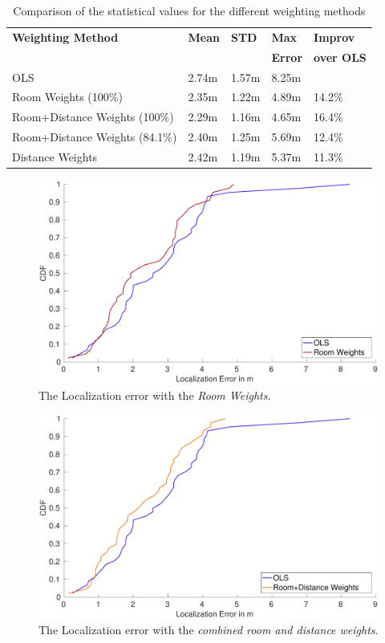 \begin{table}[hb]
\centering
\begin{tabular}{l l l l l}
\toprule
\textbf{Weighting Method}&\textbf{Mean}&\textbf{STD}&\textbf{Max}&\textbf{Improv}\\
&&\textbf{}&\textbf{Error}&\textbf{over OLS}\\
\midrule
OLS&2.74m&1.57m&8.25m&\\
Room Weights (100\%)&2.35m&1.22m&4.89m&14.2\%\\
Room+Distance Weights (100\%)&2.29m&1.16m&4.65m&16.4\%\\
Room+Distance Weights (84.1\%)&2.40m&1.25m&5.69m&12.4\%\\
Distance Weights&2.42m&1.19m&5.37m&11.3\%\\
\bottomrule
\end{tabular}
\caption[Weighting - statistical values]{Comparison of the statistical values for the different weighting methods}
\label{tab:WeightingStatisticalValues}
\end{table}

\begin{figure}[p]
\centering
\includegraphics[width=\textwidth]{Figures/WeightingCDF_RW}
\decoRule
\caption[CDF Room Weights method (best-case)]{The Localization error with the \emph{Room Weights}.}
\label{fig:WeightingCDFRoom}
\end{figure}

\begin{figure}[p]
\centering
\includegraphics[width=\textwidth]{Figures/WeightingCDF_RDW}
\decoRule
\caption[CDF Room+Distance Weights method (best-case)]{The Localization error with the \emph{combined room and distance weights}.}
\label{fig:WeightingCDFRoomDistance}
\end{figure}

